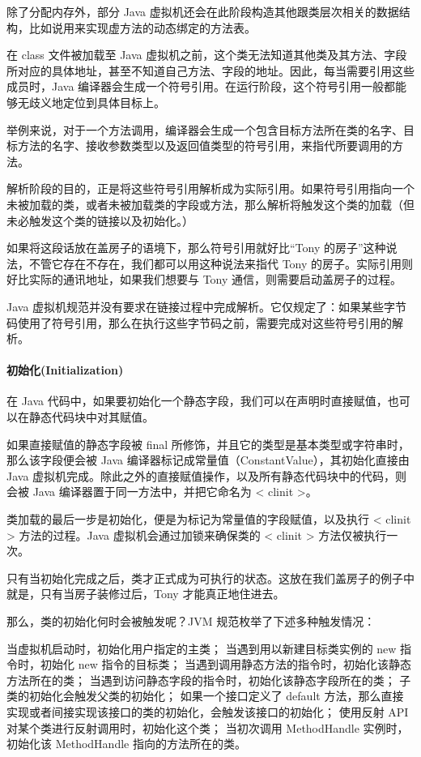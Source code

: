 \documentclass[../../../interview-questions.tex]{subfiles}
\begin{document}
除了分配内存外，部分 Java 虚拟机还会在此阶段构造其他跟类层次相关的数据结构，比如说用来实现虚方法的动态绑定的方法表。

在 class 文件被加载至 Java 虚拟机之前，这个类无法知道其他类及其方法、字段所对应的具体地址，甚至不知道自己方法、字段的地址。因此，每当需要引用这些成员时，Java 编译器会生成一个符号引用。在运行阶段，这个符号引用一般都能够无歧义地定位到具体目标上。

举例来说，对于一个方法调用，编译器会生成一个包含目标方法所在类的名字、目标方法的名字、接收参数类型以及返回值类型的符号引用，来指代所要调用的方法。

解析阶段的目的，正是将这些符号引用解析成为实际引用。如果符号引用指向一个未被加载的类，或者未被加载类的字段或方法，那么解析将触发这个类的加载（但未必触发这个类的链接以及初始化。）

如果将这段话放在盖房子的语境下，那么符号引用就好比“Tony 的房子”这种说法，不管它存在不存在，我们都可以用这种说法来指代 Tony 的房子。实际引用则好比实际的通讯地址，如果我们想要与 Tony 通信，则需要启动盖房子的过程。

Java 虚拟机规范并没有要求在链接过程中完成解析。它仅规定了：如果某些字节码使用了符号引用，那么在执行这些字节码之前，需要完成对这些符号引用的解析。

\paragraph{初始化(Initialization)}


在 Java 代码中，如果要初始化一个静态字段，我们可以在声明时直接赋值，也可以在静态代码块中对其赋值。

如果直接赋值的静态字段被 final 所修饰，并且它的类型是基本类型或字符串时，那么该字段便会被 Java 编译器标记成常量值（ConstantValue），其初始化直接由 Java 虚拟机完成。除此之外的直接赋值操作，以及所有静态代码块中的代码，则会被 Java 编译器置于同一方法中，并把它命名为 < clinit >。

类加载的最后一步是初始化，便是为标记为常量值的字段赋值，以及执行 < clinit > 方法的过程。Java 虚拟机会通过加锁来确保类的 < clinit > 方法仅被执行一次。

只有当初始化完成之后，类才正式成为可执行的状态。这放在我们盖房子的例子中就是，只有当房子装修过后，Tony 才能真正地住进去。

那么，类的初始化何时会被触发呢？JVM 规范枚举了下述多种触发情况：

当虚拟机启动时，初始化用户指定的主类；
当遇到用以新建目标类实例的 new 指令时，初始化 new 指令的目标类；
当遇到调用静态方法的指令时，初始化该静态方法所在的类；
当遇到访问静态字段的指令时，初始化该静态字段所在的类；
子类的初始化会触发父类的初始化；
如果一个接口定义了 default 方法，那么直接实现或者间接实现该接口的类的初始化，会触发该接口的初始化；
使用反射 API 对某个类进行反射调用时，初始化这个类；
当初次调用 MethodHandle 实例时，初始化该 MethodHandle 指向的方法所在的类。
\end{document}

